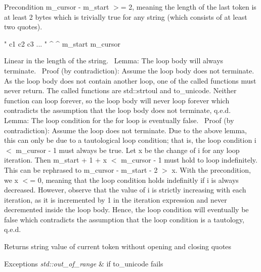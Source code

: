 \begin{DoxyPrecond}{Precondition}
{\ttfamily m\+\_\+cursor -\/ m\+\_\+start $>$= 2}, meaning the length of the last token is at least 2 bytes which is trivially true for any string (which consists of at least two quotes). \begin{DoxyVerb}" c1 c2 c3 ... "
^                ^
m_start          m_cursor
\end{DoxyVerb}

\end{DoxyPrecond}
Linear in the length of the string.~\newline
 Lemma\+: The loop body will always terminate.~\newline
 Proof (by contradiction)\+: Assume the loop body does not terminate. As the loop body does not contain another loop, one of the called functions must never return. The called functions are {\ttfamily std\+::strtoul} and to\+\_\+unicode. Neither function can loop forever, so the loop body will never loop forever which contradicts the assumption that the loop body does not terminate, q.\+e.\+d.~\newline
 Lemma\+: The loop condition for the for loop is eventually false.~\newline
 Proof (by contradiction)\+: Assume the loop does not terminate. Due to the above lemma, this can only be due to a tautological loop condition; that is, the loop condition i $<$ m\+\_\+cursor -\/ 1 must always be true. Let x be the change of i for any loop iteration. Then m\+\_\+start + 1 + x $<$ m\+\_\+cursor -\/ 1 must hold to loop indefinitely. This can be rephrased to m\+\_\+cursor -\/ m\+\_\+start -\/ 2 $>$ x. With the precondition, we x $<$= 0, meaning that the loop condition holds indefinitly if i is always decreased. However, observe that the value of i is strictly increasing with each iteration, as it is incremented by 1 in the iteration expression and never decremented inside the loop body. Hence, the loop condition will eventually be false which contradicts the assumption that the loop condition is a tautology, q.\+e.\+d.

\begin{DoxyReturn}{Returns}
string value of current token without opening and closing quotes 
\end{DoxyReturn}

\begin{DoxyExceptions}{Exceptions}
{\em std\+::out\+\_\+of\+\_\+range} & if to\+\_\+unicode fails \\
\hline
\end{DoxyExceptions}


